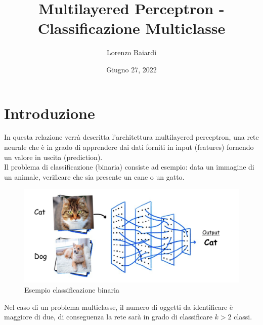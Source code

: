 \documentclass{article}
\title{Multilayered Perceptron - Classificazione Multiclasse}
\author{Lorenzo Baiardi}
\date{Giugno 27, 2022}
\begin{document}
\maketitle

    \section{Introduzione}\label{sec:introduzione}
        In questa relazione verrà descritta l'architettura multilayered perceptron,
        una rete neurale che è in grado di apprendere dai dati forniti in input (features) fornendo un valore in uscita (prediction). \\
        Il problema di classificazione (binaria) consiste ad esempio: data un immagine di un animale, verificare che sia presente un cane o un gatto.
        \begin{figure}[H]
            \centering
            \includegraphics[scale=0.50]{classification_problem}
            \caption{Esempio classificazione binaria}
            \label{fig:figureClassification}
        \end{figure}
        Nel caso di un problema multiclasse, il numero di oggetti da identificare è maggiore di due, di conseguenza la rete sarà in grado di
        classificare $k>2$ classi.
\end{document}

